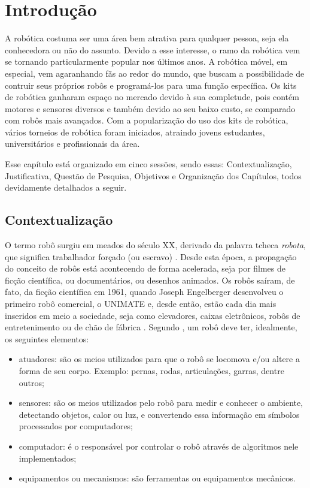 \chapter{Introdução}\label{introducao}
A robótica costuma ser uma área bem atrativa para qualquer pessoa, seja ela conhecedora ou não do assunto. Devido a esse interesse, o ramo da robótica vem se tornando particularmente popular nos últimos anos. A robótica móvel, em especial, vem agaranhando fãs ao redor do mundo, que buscam a possibilidade de contruir seus próprios robôs e programá-los para uma função específica. Os kits de robótica ganharam espaço no mercado devido à sua completude, pois contém motores e sensores diversos e também devido ao seu baixo custo, se comparado com robôs mais avançados. Com a popularização do uso dos kits de robótica, vários torneios de robótica foram iniciados, atraindo jovens estudantes, universitários e profissionais da área. 

Esse capítulo está organizado em cinco sessões, sendo essas: Contextualização, Justificativa, Questão de Pesquisa, Objetivos e Organização dos Capítulos, todos devidamente detalhados a seguir.

\section{Contextualização}

O termo robô surgiu em meados do século XX, derivado da palavra tcheca \textit{robota}, que significa trabalhador forçado (ou escravo) \cite{da2009roboeduc}. Desde esta época, a propagação do conceito de robôs está acontecendo de forma acelerada, seja por filmes de ficção científica, ou documentários, ou desenhos animados. 
Os robôs saíram, de fato, da ficção científica em 1961, quando Joseph Engelberger desenvolveu o primeiro robô comercial, o UNIMATE e, desde então, estão cada dia mais inseridos em meio a sociedade, seja como elevadores, caixas eletrônicos, robôs de entretenimento ou de chão de fábrica . 
Segundo \cite{da2009roboeduc}, um robô deve ter, idealmente, os seguintes elementos:
\begin{itemize}
\item atuadores: são os meios utilizados para que o robô se locomova e/ou altere a forma de seu corpo. Exemplo: pernas, rodas, articulações, garras, dentre outros;
\item sensores: são os meios utilizados pelo robô para medir e conhecer o ambiente, detectando objetos, calor ou luz, e convertendo essa informação em símbolos processados por computadores;
\item computador: é o responsável por controlar o robô através de algoritmos nele implementados;
\item equipamentos ou mecanismos: são ferramentas ou equipamentos mecânicos.
\end{itemize}

